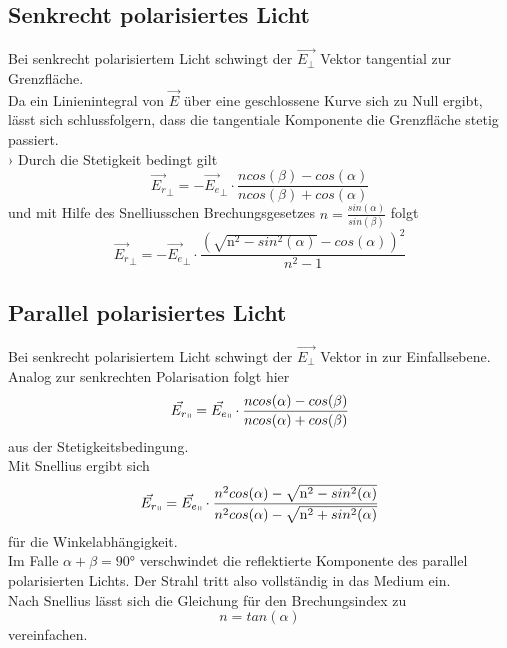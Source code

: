 \subsection{Senkrecht polarisiertes Licht}
Bei senkrecht polarisiertem Licht schwingt der $\vec{E_\bot}$ Vektor tangential zur Grenzfläche.\\
Da ein Linienintegral von $\vec{E}$ über eine geschlossene Kurve sich zu Null ergibt, lässt sich schlussfolgern, dass 
die tangentiale Komponente die Grenzfläche stetig passiert.\\›
Durch die Stetigkeit bedingt gilt
\begin{equation*}
    \vec{E_r}_\bot = -\vec{E_e}_\bot \cdot \frac{n cos(\beta)-cos(\alpha)}{n cos(\beta)+cos(\alpha)}
\end{equation*}
und mit Hilfe des Snelliusschen Brechungsgesetzes $n = \frac{sin(\alpha)}{sin(\beta)}$ folgt 
\begin{equation*}
    \vec{E_r}_\bot = -\vec{E_e}_\bot \cdot \frac{(\sqrt{\mathrm{n^2} - sin^2(\alpha)} - cos(\alpha))^2}{n^2 - 1}
\end{equation*}

 \subsection{Parallel polarisiertes Licht}
Bei senkrecht polarisiertem Licht schwingt der $\vec{E_\bot}$ Vektor in zur Einfallsebene.\\
Analog zur senkrechten Polarisation folgt hier
\begin{equation*}
    \vec{E_r}_\shortparallel  = \vec{E_e}_\shortparallel  \cdot \frac{n cos(\alpha)-cos(\beta)}{n cos(\alpha)+cos(\beta)}
\end{equation*}
aus der Stetigkeitsbedingung.\\
Mit Snellius ergibt sich  
\begin{equation*}
    \vec{E_r}_\shortparallel  = \vec{E_e}_\shortparallel  \cdot \frac{n^2 cos(\alpha) - \sqrt{\mathrm{n^2} - sin^2(\alpha)}}{n^2 cos(\alpha) - \sqrt{\mathrm{n^2} + sin^2(\alpha)}}
\end{equation*}
für die Winkelabhängigkeit.\\
Im Falle $\alpha + \beta = 90°$ verschwindet die reflektierte Komponente des parallel polarisierten Lichts. Der Strahl tritt also
vollständig in das Medium ein.\\
Nach Snellius lässt sich die Gleichung für den Brechungsindex zu 
\begin{equation*}
    n = tan(\alpha)
\end{equation*}
vereinfachen. \\

